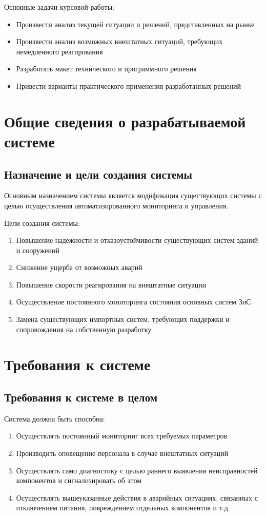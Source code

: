Основные задачи курсовой работы:
\begin{itemize}
	\itemsep0em 
	\item Произвести анализ текущей ситуации и решений, представленных на рынке
	\item Произвести анализ возможных внештатных ситуаций, требующих немедленного реагирования
	\item Разработать макет технического и программного решения
	\item Привести варианты практического применения разработанных решений 
\end{itemize}


\newpage\section{Общие сведения о разрабатываемой системе}
\subsection{Назначение и цели создания системы}
Основным назначением системы является модификация существующих системы с целью осуществления автоматизированного мониторинга и управления.

Цели создания системы:
\begin{enumerate}
	\itemsep0em 
	\item Повышение надежности и отказоустойчивости существующих систем зданий и сооружений
	\item Снижение ущерба от возможных аварий
	\item Повышение скорости реагирования на внештатные ситуации
	\item Осуществление постоянного мониторинга состояния основных систем ЗиС
	\item Замена существующих импортных систем, требующих поддержки и сопровождения на собственную разработку
\end{enumerate}

\section{Требования к системе}
\subsection{Требования к системе в целом}
Система должна быть способна:
\begin{enumerate}
	\itemsep0em 
	\item Осуществлять постоянный мониторинг всех требуемых параметров
	\item Производить оповещение персонала в случае внештатных ситуаций
	\item Осуществлять само диагностику с целью раннего выявления неисправностей компонентов и сигнализировать об этом
	\item Осуществлять вышеуказанные действия в аварийных ситуациях, связанных с отключением питания, повреждением отдельных компонентов и т.д.
\end{enumerate}

